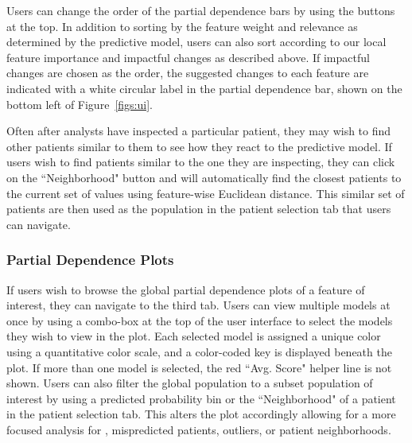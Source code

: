 Users can change the order of the partial dependence bars by using the buttons at the top.  In addition to sorting by the feature weight and relevance as determined by the predictive model, users can also sort according to our local feature importance and impactful changes as described above.
If impactful changes are chosen as the order, the suggested changes to each feature are indicated with a white circular label in the partial dependence bar, shown on the bottom left of Figure~\ref{figs:ui}.

Often after analysts have inspected a particular patient, they may wish to find other patients similar to them to see how they react to the predictive model.  If users wish to find patients similar to the one they are inspecting, they can click on the ``Neighborhood" button and \prospector will automatically find the closest patients to the current set of values using feature-wise Euclidean distance.  This similar set of patients are then used as the population in the patient selection tab that users can navigate.

\subsubsection{Partial Dependence Plots}

If users wish to browse the global partial dependence plots of a feature of interest, they can navigate to the third tab.  Users can view multiple models at once by using a combo-box at the top of the user interface to select the models they wish to view in the plot.  Each selected model is assigned a unique color using a quantitative color scale, and a color-coded key is displayed beneath the plot.  If more than one model is selected, the red ``Avg. Score" helper line is not shown.  Users can also filter the global population to a subset population of interest by using a  predicted probability bin or the ``Neighborhood" of a patient in the patient selection tab. This alters the plot accordingly allowing for a more focused analysis for \eg, mispredicted patients, outliers, or patient neighborhoods.






